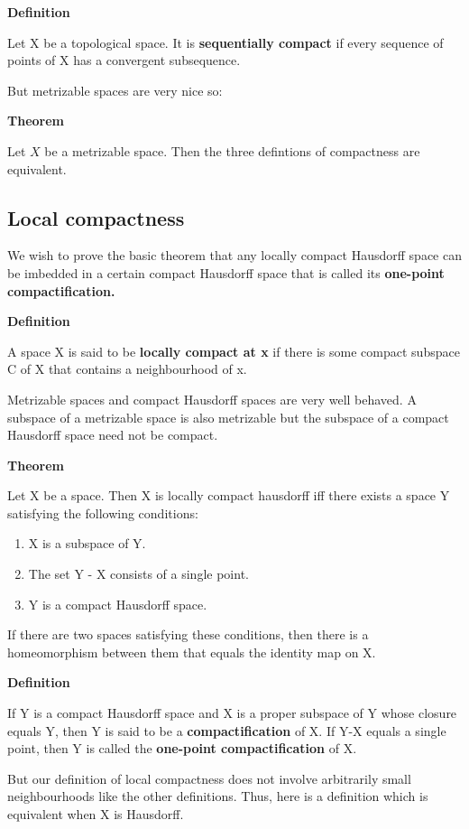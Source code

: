 \documentclass[11pt]{article}
\begin{document}
\textbf{Definition}

Let X be a topological space. It is \textbf{sequentially compact} if every sequence of points of X has a convergent subsequence.

But metrizable spaces are very nice so:

\textbf{Theorem}

Let \(X\) be a metrizable space. Then the three defintions of compactness are equivalent.


\subsection{Local compactness}
\label{sec:org7ee03dc}

We wish to prove the basic theorem that any locally compact Hausdorff space can be imbedded in a certain compact Hausdorff space that is called its \textbf{one-point compactification.}

\textbf{Definition}

A space X is said to be \textbf{locally compact at x} if there is some compact subspace C of X that contains a neighbourhood of x.

Metrizable spaces and compact Hausdorff spaces are very well behaved. A subspace of a metrizable space is also metrizable but the subspace of a compact Hausdorff space need not be compact.

\textbf{Theorem}

Let X be a space. Then X is locally compact hausdorff iff there exists a space Y satisfying the following conditions:

\begin{enumerate}
\item X is a subspace of Y.
\item The set Y - X consists of a single point.
\item Y is a compact Hausdorff space.
\end{enumerate}

If there are two spaces satisfying these conditions, then there is a homeomorphism between them that equals the identity map on X.

\textbf{Definition}

If Y is a compact Hausdorff space and X is a proper subspace of Y whose closure equals Y, then Y is said to be a \textbf{compactification} of X. If Y-X equals a single point, then Y is called the \textbf{one-point compactification} of X.


But our definition of local compactness does not involve arbitrarily small neighbourhoods like the other definitions. Thus, here is a definition which is equivalent when X is Hausdorff.
\end{document}
